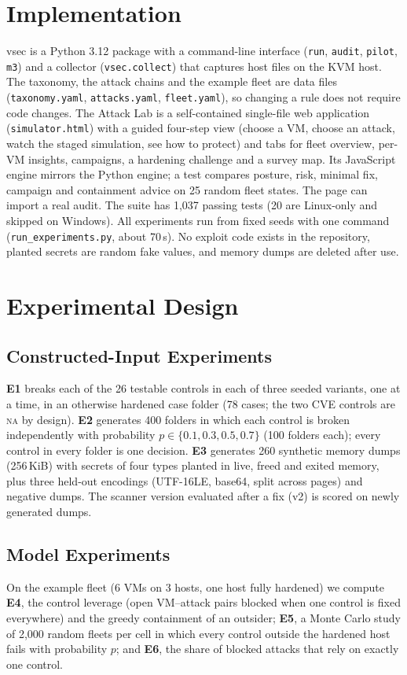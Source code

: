\documentclass[conference]{IEEEtran}
\newcommand{\na}{\textsc{na}}
\begin{document}
\section{Implementation}
vsec is a Python 3.12 package with a command-line interface (\texttt{run}, \texttt{audit}, \texttt{pilot}, \texttt{m3}) and a collector (\texttt{vsec.collect}) that captures host files on the KVM host. The taxonomy, the attack chains and the example fleet are data files (\texttt{taxonomy.yaml}, \texttt{attacks.yaml}, \texttt{fleet.yaml}), so changing a rule does not require code changes. The Attack Lab is a self-contained single-file web application (\texttt{simulator.html}) with a guided four-step view (choose a VM, choose an attack, watch the staged simulation, see how to protect) and tabs for fleet overview, per-VM insights, campaigns, a hardening challenge and a survey map. Its JavaScript engine mirrors the Python engine; a test compares posture, risk, minimal fix, campaign and containment advice on 25 random fleet states. The page can import a real audit. The suite has 1,037 passing tests (20 are Linux-only and skipped on Windows). All experiments run from fixed seeds with one command (\texttt{run\_experiments.py}, about 70\,s). No exploit code exists in the repository, planted secrets are random fake values, and memory dumps are deleted after use.

\section{Experimental Design}
\subsection{Constructed-Input Experiments}
\textbf{E1} breaks each of the 26 testable controls in each of three seeded variants, one at a time, in an otherwise hardened case folder (78 cases; the two CVE controls are \na{} by design). \textbf{E2} generates 400 folders in which each control is broken independently with probability $p\in\{0.1,0.3,0.5,0.7\}$ (100 folders each); every control in every folder is one decision. \textbf{E3} generates 260 synthetic memory dumps (256\,KiB) with secrets of four types planted in live, freed and exited memory, plus three held-out encodings (UTF-16LE, base64, split across pages) and negative dumps. The scanner version evaluated after a fix (v2) is scored on newly generated dumps.

\subsection{Model Experiments}
On the example fleet (6 VMs on 3 hosts, one host fully hardened) we compute \textbf{E4}, the control leverage (open VM--attack pairs blocked when one control is fixed everywhere) and the greedy containment of an outsider; \textbf{E5}, a Monte Carlo study of 2,000 random fleets per cell in which every control outside the hardened host fails with probability $p$; and \textbf{E6}, the share of blocked attacks that rely on exactly one control.
\end{document}
